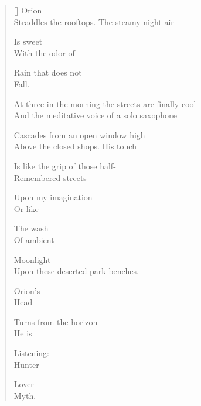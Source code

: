 \label{ch:poem_for_the_mythic_lover}
\settowidth{\versewidth}{Above the closed shops.\qquad\qquad His touch}
\begin{verse}[\versewidth]
                             Orion\\
Straddles the rooftops.   The steamy night air

Is sweet\\
With the odor of

Rain that does not\\
Fall.

At three in the morning the streets are finally cool\\
And the meditative voice of a solo saxophone

Cascades from an open window high\\
Above the closed shops.                      His touch

Is like the grip of those half-\\
Remembered streets

Upon my imagination\\
Or like

The wash\\
Of ambient

Moonlight\\
Upon these deserted park benches.

Orion's\\
Head

Turns from the horizon\\
He is

Listening:\\
Hunter

Lover\\
Myth.
\end{verse}
